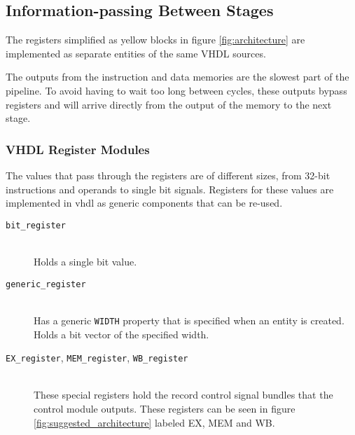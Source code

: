 \subsection{Information-passing Between Stages}
The registers simplified as yellow blocks in figure \ref{fig:architecture} are implemented as separate entities of the same VHDL sources.

The outputs from the instruction and data memories are the slowest part of the pipeline.
To avoid having to wait too long between cycles,
these outputs bypass registers and will arrive directly from the output of the memory to the next stage.

\subsubsection{VHDL Register Modules}
The values that pass through the registers are of different sizes,
from 32-bit instructions and operands to single bit signals.
Registers for these values are implemented in \gls{vhdl} as generic components that can be re-used.

\begin{description}
    \item[\texttt{bit\_register}]
        \hfill\\
        Holds a single bit value.
    \item[\texttt{generic\_register}]
        \hfill\\
        Has a generic \texttt{WIDTH} property that is specified when an entity is created.
        Holds a bit vector of the specified width.
    \item[\texttt{EX\_register}, \texttt{MEM\_register}, \texttt{WB\_register}]
        \hfill\\
        These special registers hold the record control signal bundles that the control module outputs.
        These registers can be seen in figure \ref{fig:suggested_architecture} labeled EX, MEM and WB.
\end{description}

